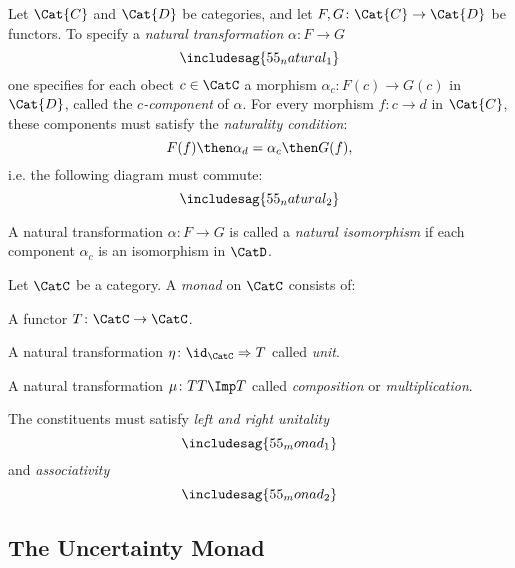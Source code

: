 \begin{shaded}
\begin{definition}
Let $\Cat{C}$ and $\Cat{D}$ be categories, and let $F,G\colon \Cat{C}\to \Cat{D}$ be functors. To specify a \emph{natural transformation} $\alpha\colon F\to G$
\begin{equation}
\includesag{55_natural_1}
\end{equation}
one specifies for each obect $c\in \CatC$ a morphism $\alpha_c\colon F(c)\to G(c)$ in $\Cat{D}$, called the $c$\emph{-component} of $\alpha$. For every morphism $f\colon c\to d$ in $\Cat{C}$, these components must satisfy the \emph{naturality condition}:
\begin{equation}
    F(f)\then \alpha_d = \alpha_c\then G(f),
\end{equation}
i.e. the following diagram must commute:
\begin{equation}
\includesag{55_natural_2}
\end{equation}
\end{definition}

\begin{remark}
A natural transformation $\alpha\colon F\to G$ is called a \emph{natural isomorphism} if each component $\alpha_c$ is an isomorphism in $\CatD$.
\end{remark}

\begin{definition}[Monad]
Let $\CatC$ be a category. A \emph{monad} on $\CatC$ consists of:
\begin{compactenum}
    \item A functor $T \colon \CatC \to \CatC$.
    \item A natural transformation $\eta \colon \id_\CatC \Rightarrow T$ called \emph{unit}.
    \item A natural transformation $\mu\colon TT\Imp T$ called \emph{composition} or \emph{multiplication}.
\end{compactenum}
The constituents must satisfy \emph{left and right unitality}
\begin{equation}
\includesag{55_monad_1}
\end{equation}
and \emph{associativity}
\begin{equation}
\includesag{55_monad_2}
\end{equation}
\end{definition}
\end{shaded}


\subsection{The Uncertainty Monad}
